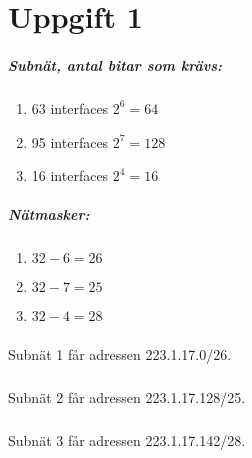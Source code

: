 \section{Uppgift 1}

\subparagraph{ Subnät, antal bitar som krävs:}
\begin{enumerate}
\item 63 interfaces \aprox $2^6 = 64$
\item 95 interfaces \aprox $2^7 = 128 $
\item 16 interfaces \aprox $2^4 = 16 $
\end{enumerate}



\subparagraph{ Nätmasker:}
\begin{enumerate}
\item $32-6=26$
\item $32-7=25$
\item $32-4=28$
\end{enumerate}

\subparagraph{}
Subnät 1 får adressen 223.1.17.0/26.
\subparagraph{}
Subnät 2 får adressen 223.1.17.128/25.
\subparagraph{}
Subnät 3 får adressen 223.1.17.142/28.

